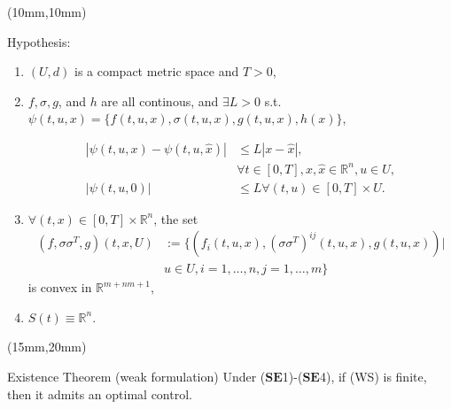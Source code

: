 \begin{frame}[plain]
	\begin{textblock*}{110mm}(10mm,10mm)
		\begin{graybox}{Hypothesis:}
			\begin{enumerate}[(\textbf{{SE}}-1)]
				\item<1->
					$(U,d)$ is a compact metric space and $T>0$,
				\item<2->
					$f,\sigma,g$, and $h$ are all continous, and $\exists L>0$ s.t. $\psi(t,u,x)=\{f(t,u,x),\sigma(t,u,x),g(t,u,x),h(x)\}$, 
					
					\begin{align*}
						|\psi(t,u,x)-\psi(t,u,\hat{x})|&\leq L|x-\hat{x}|,\\
						&\forall t\in [0,T], x,\hat{x}\in \mathbb{R}^n,u\in U,\\
						|\psi(t,u,0)|&\leq L \forall (t,u)\in[0,T]\times U.
					\end{align*}  
				\item<3->
					$\forall (t,x)\in [0,T]\times \mathbb{R}^n$, the set
					\begin{align*}
						(f,\sigma\sigma^T,g)(t,x,U)&:=\{(f_i(t,u,x),(\sigma\sigma^T)^{ij}(t,u,x),g(t,u,x))|\\
						&u\in U,i=1,\ldots,n,j=1,\ldots,m\}
					\end{align*}
					is convex in $\mathbb{R}^{m+nm+1}$,
				\item<4->
					$S(t)\equiv\mathbb{R}^n$.
			\end{enumerate}	
		\end{graybox}
	\end{textblock*}
\end{frame}
\begin{frame}[plain]
	
	\begin{textblock*}{100mm}(15mm,20mm)
		\begin{graybox}{Existence Theorem (weak formulation)}
			Under ($\mathbf{SE}$1)-($\mathbf{SE}$4), if (WS) is finite, then it admits an optimal control.
		\end{graybox}
	\end{textblock*}

\end{frame}
\begin{frame}[plain]

\begin{bibunit}[abbrv]
	\nocite{Lions1971}
	\putbib
\end{bibunit}
	\begin{bibunit}[abbrv]
		\nocite{Wendell2006}
		\putbib
	\end{bibunit}
	\begin{bibunit}[abbrv]
		\nocite{Fredi2010}
		\putbib
	\end{bibunit}
\end{frame}


